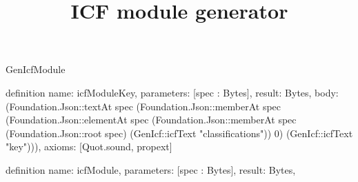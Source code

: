 \begin{lexlean}{GenIcfModule}
\title{ICF module generator}
\begin{semanticmodule}
definition{
  name: icfModuleKey,
  parameters: [spec : Bytes],
  result: Bytes,
  body: (Foundation.Json::textAt spec (Foundation.Json::memberAt spec (Foundation.Json::elementAt spec (Foundation.Json::memberAt spec (Foundation.Json::root spec) (GenIcf::icfText "classifications")) 0) (GenIcf::icfText "key"))),
  axioms: [Quot.sound, propext]
}

definition{
  name: icfModule,
  parameters: [spec : Bytes],
  result: Bytes,
}
\end{semanticmodule}
\end{lexlean}
